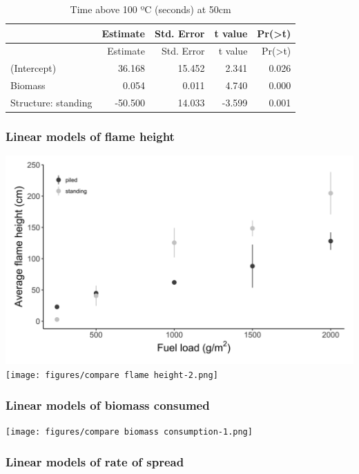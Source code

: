 \documentclass[11pt,a4paper]{article}
\begin{document}
\begin{longtable}[]{@{}lrrrr@{}}
\caption{Time above 100 ºC (seconds) at 50cm}\tabularnewline
\toprule
& Estimate & Std. Error & t value &
Pr(\textgreater{}\textbar{}t\textbar{})\tabularnewline
\midrule
\endfirsthead
\toprule
& Estimate & Std. Error & t value &
Pr(\textgreater{}\textbar{}t\textbar{})\tabularnewline
\midrule
\endhead
(Intercept) & 36.168 & 15.452 & 2.341 & 0.026\tabularnewline
Biomass & 0.054 & 0.011 & 4.740 & 0.000\tabularnewline
Structure: standing & -50.500 & 14.033 & -3.599 & 0.001\tabularnewline
\bottomrule
\end{longtable}

\hypertarget{linear-models-of-flame-height}{%
\subsubsection{Linear models of flame
height}\label{linear-models-of-flame-height}}

\includegraphics{figures/compare flame height-1.png}
\texttt{[image: figures/compare flame height-2.png]}

\hypertarget{linear-models-of-biomass-consumed}{%
\subsubsection{Linear models of biomass
consumed}\label{linear-models-of-biomass-consumed}}

\texttt{[image: figures/compare biomass consumption-1.png]}

\hypertarget{linear-models-of-rate-of-spread}{%
\subsubsection{Linear models of rate of
spread}\label{linear-models-of-rate-of-spread}}
\end{document}
